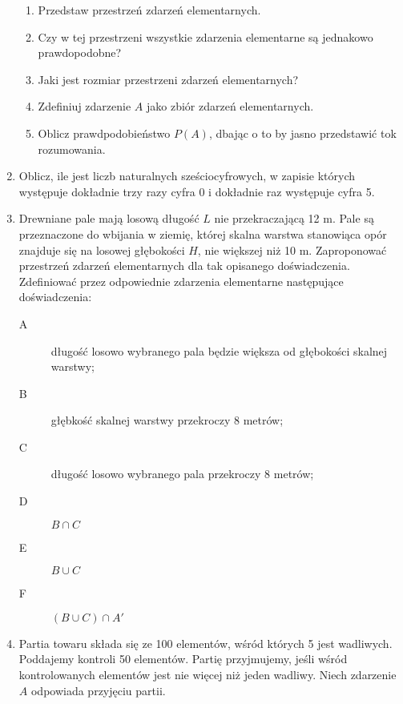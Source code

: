 \documentclass{mwart}
\newcommand{\ans}[1]{}
\newcommand{\ans}[1]{\emph{Odpowiedź:} #1}
\begin{document}
\begin{enumerate}
\begin{enumerate}%
\item Przedstaw przestrzeń zdarzeń elementarnych. \ans{$\Omega=\{\omega_{i_1,\ldots,i_5}|i_j=1,2,\ldots,6\}$}%
\item Czy w tej przestrzeni wszystkie zdarzenia elementarne są jednakowo prawdopodobne? \ans{Tak}%
\item Jaki jest rozmiar przestrzeni zdarzeń elementarnych? \ans{$\left|\Omega\right|=6^5$}%
\item Zdefiniuj zdarzenie $A$ jako zbiór zdarzeń elementarnych. \ans{$A=\{\omega_{i_1,\ldots,i_5}|\exists j: i_j=1 \land \forall k\neq j: i_k\neq 1\}$, $\left|A\right|=5\cdot5^4$}%
\item Oblicz prawdpodobieństwo $P(A)$, dbając o to by jasno przedstawić tok rozumowania. \ans{$P(A)=\frac{5^5}{6^5}=\frac{5}{6}^5\approx 0{,}40$}%
\end{enumerate}%
\item Oblicz, ile jest liczb naturalnych sześciocyfrowych, w zapisie których występuje dokładnie trzy razy cyfra 0 i dokładnie raz występuje cyfra 5. \ans{${8\choose 2}3\frac{5!}{3!}+8\cdot\left(\frac{5!}{3!2!}+\frac{5!}{3!}\right)=1920$}
\item  Drewniane pale mają losową długość $L$ nie przekraczającą 12 m. Pale są przeznaczone do wbijania w ziemię, której skalna warstwa stanowiąca opór znajduje się na losowej głębokości $H$, nie większej niż 10 m. Zaproponować przestrzeń zdarzeń elementarnych dla tak opisanego doświadczenia. Zdefiniować przez odpowiednie zdarzenia elementarne następujące doświadczenia:
\begin{description}
\item[A] długość losowo wybranego pala będzie większa od głębokości skalnej warstwy;
\item[B] głębkość skalnej warstwy przekroczy 8 metrów;
\item[C] długość losowo wybranego pala przekroczy 8 metrów;
\item[D] $B\cap C$
\item[E] $B\cup C$
\item[F] $(B\cup C)\cap A'$
\end{description}
\item Partia towaru składa się ze 100 elementów, wśród których 5 jest wadliwych. Poddajemy kontroli 50 elementów. Partię przyjmujemy, jeśli wśród kontrolowanych elementów jest nie więcej niż jeden wadliwy. Niech zdarzenie $A$ odpowiada przyjęciu partii.
\begin{enumerate}%

\end{enumerate}
\end{enumerate}
\end{document}
